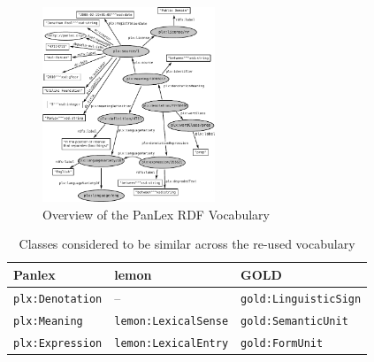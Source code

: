 \documentclass[sw]{iosart2c}
\begin{document}
\begin{figure}
\includegraphics[width=0.46\textwidth]{images/pdf/ontology.pdf}
\caption{Overview of the PanLex RDF Vocabulary}
\label{fig:vocabulary}
\end{figure}

\begin{table}
  \centering\begin{scriptsize}
  \begin{tabular}{p{48px}p{62px}p{70px}}
    Panlex                  & lemon                       & GOLD \\
    \midrule
    \texttt{plx:Denotation} & --                          & \texttt{gold:LinguisticSign} \\
    \texttt{plx:Meaning}    & \texttt{lemon:LexicalSense} & \texttt{gold:SemanticUnit} \\
    \texttt{plx:Expression} & \texttt{lemon:LexicalEntry} & \texttt{gold:FormUnit} \\
  \end{tabular}
  \end{scriptsize}
  \caption{Classes considered to be similar across the re-used vocabulary}
  \label{tbl:sameclasses}
\end{table}
\end{document}
